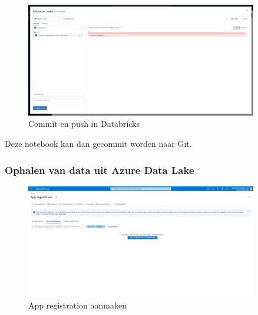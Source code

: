 \begin{figure}[H]
    \centering
    \includegraphics[width=0.9\textwidth]{./graphics/databricks/git_4.png}
    \caption{Commit en push in Databricks}
\end{figure}

Deze notebook kan dan gecommit worden naar Git.

\subsubsection{Ophalen van data uit Azure Data Lake}

\begin{figure}[H]
    \centering
    \includegraphics[width=0.9\textwidth]{./graphics/databricks/connection_1.png}
    \caption{App registration aanmaken}
\end{figure}

